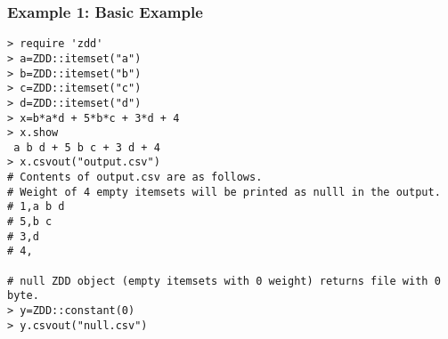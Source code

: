\subsubsection*{Example 1: Basic Example}



\begin{Verbatim}[baselinestretch=0.7,frame=single]
> require 'zdd'
> a=ZDD::itemset("a")
> b=ZDD::itemset("b")
> c=ZDD::itemset("c")
> d=ZDD::itemset("d")
> x=b*a*d + 5*b*c + 3*d + 4
> x.show
 a b d + 5 b c + 3 d + 4
> x.csvout("output.csv")
# Contents of output.csv are as follows.
# Weight of 4 empty itemsets will be printed as nulll in the output.
# 1,a b d
# 5,b c
# 3,d
# 4,

# null ZDD object (empty itemsets with 0 weight) returns file with 0 byte.
> y=ZDD::constant(0)
> y.csvout("null.csv")
\end{Verbatim}
